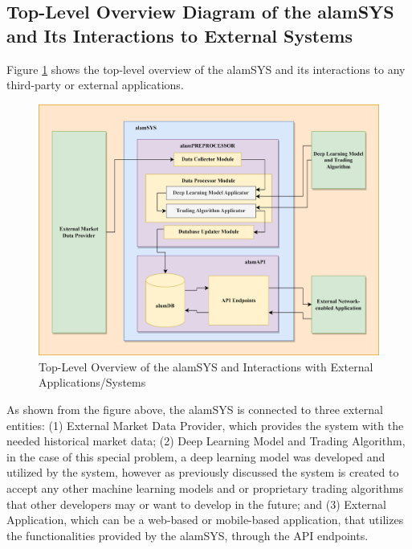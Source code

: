 \subsection{Top-Level Overview Diagram of the alamSYS and Its Interactions to External Systems}
\label{subsec:top_level_overview}

Figure \ref{fig:system_overview} shows the top-level overview of the 
alamSYS and its interactions to any third-party or external applications.

\begin{figure}[ht]
    \centering
    \includegraphics[width=1\textwidth]{./assets/Chapter_3/SystemOverview.png}
    \caption{Top-Level Overview of the alamSYS and Interactions with External Applications/Systems}
    \label{fig:system_overview}
\end{figure}
\FloatBarrier

As shown from the figure above, the alamSYS is connected to three external 
entities: (1) External Market Data Provider, which provides the system with the 
needed historical market data; (2) Deep Learning Model and Trading Algorithm, 
in the case of this special problem, a deep learning model was developed and 
utilized by the system, however as previously discussed the system is 
created to accept any other machine learning models and or proprietary trading algorithms 
that other developers may or want to develop in the future; and 
(3) External Application, which can be a web-based or mobile-based application, that
utilizes the functionalities provided by the alamSYS, through the
API endpoints.
\hfill \\

